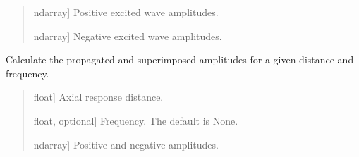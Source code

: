 \documentclass[letterpaper,10pt,english]{sphinxmanual}
\begin{document}
\begin{fulllineitems}
\begin{fulllineitems}
\begin{quote}
\begin{description}
\begin{description}
\end{description}

\begin{description}
\sphinxlineitem{\sphinxstylestrong{e\_plus}}{[}ndarray{]}
\sphinxAtStartPar
Positive excited wave amplitudes.

\sphinxlineitem{\sphinxstylestrong{e\_minus}}{[}ndarray{]}
\sphinxAtStartPar
Negative excited wave amplitudes.

\end{description}

\end{description}\end{quote}

\end{fulllineitems}


\begin{fulllineitems}
\label{\detokenize{model:pywfe.Model.propagated_amplitudes}}
\pysigstartsignatures
{}
\pysigstopsignatures
\sphinxAtStartPar
Calculate the propagated and superimposed amplitudes
for a given distance and frequency.
\begin{quote}\begin{description}
\begin{description}
\sphinxlineitem{\sphinxstylestrong{x\_r}}{[}float{]}
\sphinxAtStartPar
Axial response distance.

\sphinxlineitem{\sphinxstylestrong{f}}{[}float, optional{]}
\sphinxAtStartPar
Frequency. The default is None.

\end{description}

\begin{description}
\sphinxlineitem{\sphinxstylestrong{b\_plus, b\_minus}}{[}ndarray{]}
\sphinxAtStartPar
Positive and negative amplitudes.

\end{description}

\end{description}\end{quote}

\end{fulllineitems}


\end{fulllineitems}
\end{document}
